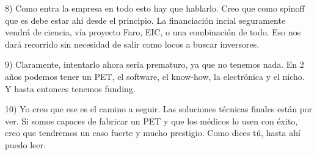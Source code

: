 8) Como entra la empresa en todo esto hay que hablarlo. Creo que como spinoff que es debe estar ahí desde el principio. La financiación incial seguramente vendrá de ciencia, vía proyecto Faro, EIC, o una combinación de todo. Eso nos dará recorrido sin necesidad de salir como locos a buscar inversores. 

9) Claramente, intentarlo ahora sería prematuro, ya que no tenemos nada. En 2 años podemos tener un PET, el software, el know-how, la electrónica y el nicho. Y hasta entonces tenemos funding. 

10) Yo creo que ese es el camino a seguir. Las soluciones técnicas finales están por ver. Si somos capaces de fabricar un PET y que los médicos lo usen con éxito, creo que tendremos un caso fuerte y mucho prestigio. Como dices tú, hasta ahí puedo leer. 

